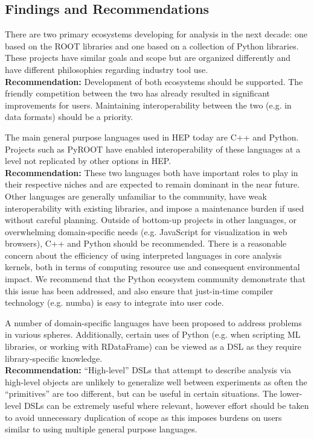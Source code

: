\subsection{Findings and Recommendations}
There are two primary ecosystems developing for analysis in the next decade: one based on the ROOT libraries and one based on a collection of Python libraries. These projects have similar goals and scope but are organized differently and have different philosophies regarding industry tool use.\\
\textbf{Recommendation:} Development of both ecosystems should be supported. The friendly competition between the two has already resulted in significant improvements for users. Maintaining interoperability between the two (e.g. in data formats) should be a priority.

The main general purpose languages used in HEP today are C++ and Python. Projects such as PyROOT have enabled interoperability of these languages at a level not replicated by other options in HEP.\\
\textbf{Recommendation:} These two languages both have important roles to play in their respective niches and are expected to remain dominant in the near future. Other languages are generally unfamiliar to the community, have weak interoperability with existing libraries, and impose a maintenance burden if used without careful planning. Outside of bottom-up projects in other languages, or overwhelming domain-specific needs (e.g. JavaScript for visualization in web browsers), C++ and Python should be recommended. There is a reasonable concern about the efficiency of using interpreted languages in core analysis kernels, both in terms of computing resource use and consequent environmental impact. We recommend that the Python ecosystem community demonstrate that this issue has been addressed, and also ensure that just-in-time compiler technology (e.g. numba) is easy to integrate into user code.

A number of domain-specific languages have been proposed to address problems in various spheres. Additionally, certain uses of Python (e.g. when scripting ML libraries, or working with RDataFrame) can be viewed as a DSL as they require library-specific knowledge.\\
\textbf{Recommendation:} ``High-level'' DSLs that attempt to describe analysis via high-level objects are unlikely to generalize well between experiments as often the ``primitives'' are too different, but can be useful in certain situations. The lower-level DSLs can be extremely useful where relevant, however effort should be taken to avoid unnecessary duplication of scope as this imposes burdens on users similar to using multiple general purpose languages.

